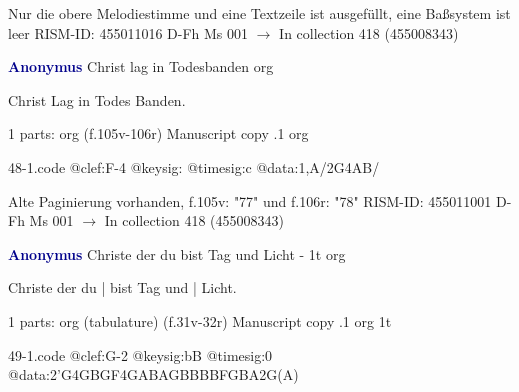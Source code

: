 \documentclass[twocolumn]{book}
\begin{document}
\newline Nur die obere Melodiestimme und eine Textzeile ist ausgefüllt, eine Baßsystem ist leer
\newline RISM-ID: 455011016
\newline D-Fh  Ms 001
\newline $\rightarrow$ In collection 418 (455008343)
      
\newline \par \vspace{7pt} \textcolor{darkblue}{\textbf{Anonymus  }}
\newline Christ lag in Todesbanden
\newline org
\newline \begin{itshape}[f.105v, heading:] Christ Lag in Todes Banden.\end{itshape} 
\newline \textcolor{darkblue}{}  1 parts: org  (f.105v-106r)
\newline Manuscript copy
.1  org  
\begin{filecontents*}{48-1.code}
@clef:F-4
@keysig:
@timesig:c
@data:1,A/2G4AB/%
\end{filecontents*}
\newline
%

\newline Alte Paginierung vorhanden, f.105v: "77" und f.106r: "78"
\newline RISM-ID: 455011001
\newline D-Fh  Ms 001
\newline $\rightarrow$ In collection 418 (455008343)
      
\newline \par \vspace{7pt} \textcolor{darkblue}{\textbf{Anonymus  }}
\newline Christe der du bist Tag und Licht - 1t
\newline org
\newline \begin{itshape}[f.31v, at left:] Christe der du | bist Tag und | Licht.\end{itshape} 
\newline \textcolor{darkblue}{}  1 parts: org (tabulature)  (f.31v-32r)
\newline Manuscript copy
.1  org  1t  
\begin{filecontents*}{49-1.code}
@clef:G-2
@keysig:bB
@timesig:0
@data:2'G4GBGF4GABAGBBBBFGBA2G(A)
\end{filecontents*}
\newline
%
\end{document}

